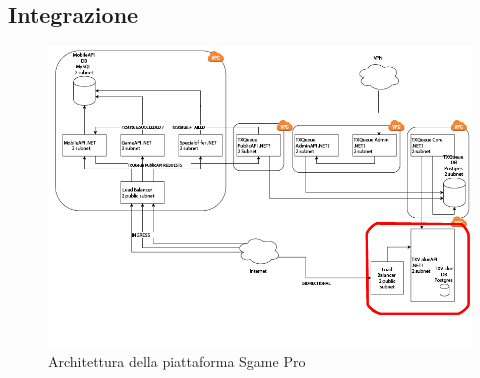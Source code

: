\documentclass[11pt]{thesistemp}
\begin{document}
\subsection{Integrazione}
\begin{figure}[h]\hfill
    \centering
    \includegraphics[width=\textwidth]{sgame-vpc.png}
        \caption{Architettura della piattaforma Sgame Pro}
    \label{fig:sgame-vpc}
\end{figure}




\end{document}
